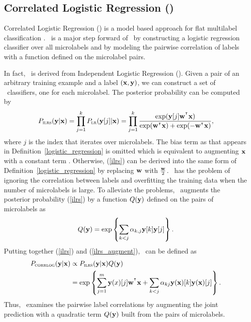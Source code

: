 {%
%
\subsection{Correlated Logistic Regression (\corrlog)} \label{sc_corrlog}

Correlated Logistic Regression (\corrlog) is a model based approach for flat multilabel classification \citep{Bian12corrlog}.
\corrlog\ is a major step forward of \iblr\ by constructing a logistic regression classifier over all microlabels and by modeling the pairwise correlation of labels with a function defined on the microlabel pairs.

In fact, \corrlog\ is derived from Independent Logistic Regression (\ilrs). 
Given a pair of an arbitrary training example and a label $(\mathbf {x},\mathbf {y})$, we can construct a set of \ilrs\ classifiers, one for each microlabel.
The posterior probability can be computed by
\begin{align}
	P_{\text{{\sc ilrs}}}(\mathbf {y}|\mathbf {x}) 
	= \prod_{j=1}^{k}P_{\text{{\sc lr}}}(\mathbf {y}[j]|\mathbf {x})
	= \prod_{j=1}^{k}\frac{\exp(\mathbf {y}[j]\mathbf {w}^{^{\intercal}}\mathbf {x})}{\exp(\mathbf {w}^{^{\intercal}}\mathbf {x})+\exp(-\mathbf {w}^{^{\intercal}}\mathbf {x})}, \label{ilrs}
\end{align}
where $j$ is the index that iterates over microlabels. 
The bias term as that appears in Definition~\ref{logistic_regression} is omitted which is equivalent to augmenting $\mathbf {x}$ with a constant term \citep{Bian12corrlog}.
Otherwise, (\ref{ilrs}) can be derived into the same form of Definition~\ref{logistic_regression} by replacing $\mathbf {w}$ with $\frac{\mathbf {w}}{2}$.
\ilrs\ has the problem of ignoring the correlation between labels and overfitting the training data when the number of microlabels is large.
To alleviate the problems, \corrlog\ augments the posterior probability (\ref{ilrs}) by a function $Q(\mathbf {y})$ defined on the pairs of microlabels as
\begin{align}
	Q(\mathbf {y}) = \exp\left\{\sum_{k<j}\alpha_{k,j}\mathbf {y}[k]\mathbf {y}[j]\right\}. \label{ilrs_augment}
\end{align}
Putting together (\ref{ilrs}) and (\ref{ilrs_augment}), \corrlog\ can be defined as
\begin{align*}
	P_{\text{{\sc corrlog}}}(\mathbf {y}|\mathbf {x}) &\propto P_{\text{{\sc ilrs}}}(\mathbf {y}|\mathbf {x}) Q(\mathbf {y}) \\
		&=\exp\left\{ \sum_{j=1}^{m}\mathbf {y}(x)[j]\mathbf {w}^{^{\intercal}}\mathbf {x} + \sum_{k<j}\alpha_{kj}\mathbf {y}(\mathbf {x})[k]\mathbf {y}(\mathbf {x})[j] \right\}.
\end{align*}
Thus, \corrlog\ examines the pairwise label correlations by augmenting the joint prediction with a quadratic term $Q(\mathbf {y})$ built from the pairs of microlabels.



}
